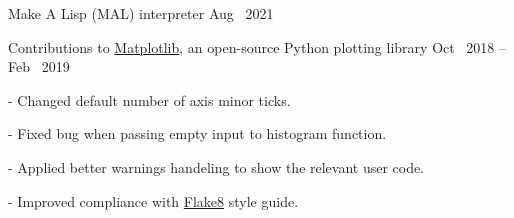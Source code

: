 

\begin{cventries}

  \cventry
  {Make A Lisp (MAL) interpreter} %
    {} %
    {} %
    {Aug \ 2021} %
    {
      \begin{cvitems} %
      \end{cvitems}
    }

  
    \cventryWithTags
    {Contributions to \hypersetup{urlcolor=blue}\href{https://www.github.com/matplotlib/matplotlib}{Matplotlib}, an open-source Python plotting library} %
    {} %
    {} %
    {Oct \ 2018 -- Feb \ 2019} %
    { }
    {
      \begin{cvitems}
        \hypersetup{urlcolor=blue}
      \item {} - Changed default number of axis minor ticks.
      \item {} - Fixed bug when passing empty input to histogram function.
      \item {} - Applied better warnings handeling to show the relevant user code.
      \item {} - Improved compliance with \href{https://flake8.pycqa.org/en/latest}{Flake8} style guide.
      \end{cvitems}
    }

  \end{cventries}
